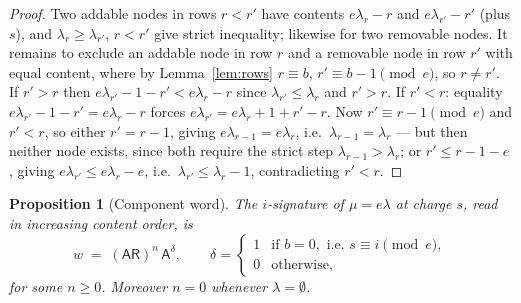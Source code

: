 \documentclass[11pt]{article}
\newtheorem{proposition}[theorem]{Proposition}
\theoremstyle{definition}
\newcommand{\Aa}{{\mathsf A}}
\newcommand{\Rr}{{\mathsf R}}
\begin{document}
\begin{proof}
Two addable nodes in rows $r < r'$ have contents $e\lambda_r - r$ and
$e\lambda_{r'} - r'$ (plus $s$), and $\lambda_r \ge \lambda_{r'}$,
$r < r'$ give strict inequality; likewise for two removable nodes. It
remains to exclude an addable node in row $r$ and a removable node in row
$r'$ with equal content, where by Lemma~\ref{lem:rows}
$r \equiv b$, $r' \equiv b-1 \pmod e$, so $r \ne r'$.
If $r' > r$ then $e\lambda_{r'} - 1 - r' < e\lambda_r - r$ since
$\lambda_{r'} \le \lambda_r$ and $r' > r$. If $r' < r$: equality
$e\lambda_{r'} - 1 - r' = e\lambda_r - r$ forces
$e\lambda_{r'} = e\lambda_r + 1 + r' - r$. Now $r' \equiv r - 1 \pmod e$
and $r' < r$, so either $r' = r-1$, giving
$e\lambda_{r-1} = e\lambda_r$, i.e.\ $\lambda_{r-1} = \lambda_r$ ---
but then neither node exists, since both require the strict step
$\lambda_{r-1} > \lambda_r$; or $r' \le r - 1 - e$, giving
$e\lambda_{r'} \le e\lambda_r - e$, i.e.\ $\lambda_{r'} \le \lambda_r - 1$,
contradicting $r' < r$.
\end{proof}

\begin{proposition}[Component word]\label{prop:cword}
The $i$-signature of $\mu = e\lambda$ at charge $s$, read in increasing
content order, is
\[
  w \;=\; (\Aa\Rr)^{n}\,\Aa^{\delta},
  \qquad \delta = \begin{cases} 1 & \text{if } b = 0,
  \text{ i.e.\ } s \equiv i \!\!\pmod e,\\ 0 & \text{otherwise,}\end{cases}
\]
for some $n \ge 0$. Moreover $n = 0$ whenever $\lambda = \emptyset$.
\end{proposition}
\end{document}
